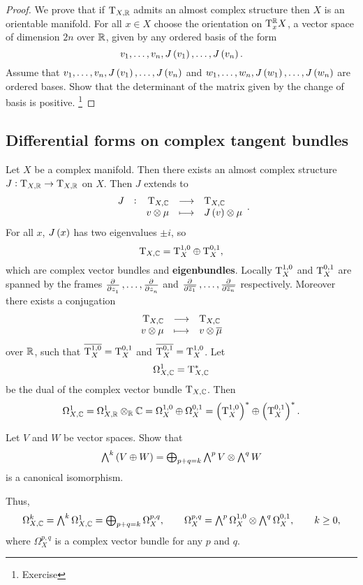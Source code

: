 \begin{proof}
We prove that if $ \mathrm{T}_{X, \mathbb{R}} $ admits an almost complex structure then $ X $ is an orientable manifold. For all $ x \in X $ choose the orientation on $ \mathrm{T}_x^{\mathbb{R}} X $, a vector space of dimension $ 2n $ over $ \mathbb{R} $, given by any ordered basis of the form
$$ v_1, \dots, v_n, J\br{v_1}, \dots, J\br{v_n}. $$
Assume that $ v_1, \dots, v_n, J\br{v_1}, \dots, J\br{v_n} $ and $ w_1, \dots, w_n, J\br{w_1}, \dots, J\br{w_n} $ are ordered bases. Show that the determinant of the matrix given by the change of basis is positive. \footnote{Exercise}
\end{proof}

\pagebreak

\subsection{Differential forms on complex tangent bundles}

Let $ X $ be a complex manifold. Then there exists an almost complex structure $ J : \mathrm{T}_{X, \mathbb{R}} \to \mathrm{T}_{X, \mathbb{R}} $ on $ X $. Then $ J $ extends to
$$ \function[J]{\T_{X, \CC}}{\T_{X, \CC}}{v \otimes \mu}{J\br{v} \otimes \mu}. $$
For all $ x $, $ J\br{x} $ has two eigenvalues $ \pm i $, so
$$ \mathrm{T}_{X, \mathbb{C}} = \mathrm{T}_X^{1, 0} \oplus \mathrm{T}_X^{0, 1}, $$
which are complex vector bundles and \textbf{eigenbundles}. Locally $ \mathrm{T}_X^{1, 0} $ and $ \mathrm{T}_X^{0, 1} $ are spanned by the frames $ \tpd{}{z_1}, \dots, \tpd{}{z_n} $ and $ \tpd{}{\overline{z_1}}, \dots, \tpd{}{\overline{z_n}} $ respectively. Moreover there exists a conjugation
$$ \function{\T_{X, \CC}}{\T_{X, \CC}}{v \otimes \mu}{v \otimes \overline{\mu}} $$
over $ \mathbb{R} $, such that $ \overline{\mathrm{T}_X^{1, 0}} = \mathrm{T}_X^{0, 1} $ and $ \overline{\mathrm{T}_X^{0, 1}} = \mathrm{T}_X^{1, 0} $. Let
$$ \Omega_{X, \mathbb{C}}^1 = \mathrm{T}_{X, \mathbb{C}}^* $$
be the dual of the complex vector bundle $ \mathrm{T}_{X, \mathbb{C}} $. Then
$$ \Omega_{X, \CC}^1 = \Omega_{X, \RR}^1 \otimes_\RR \CC = \Omega_X^{1, 0} \oplus \Omega_X^{0, 1} = \br{\T_X^{1, 0}}^* \oplus \br{\T_X^{0, 1}}^*. $$

\begin{exercise*}
Let $ V $ and $ W $ be vector spaces. Show that
$$ \textstyle\bigwedge^k\br{V \oplus W} = \bigoplus_{p + q = k} \textstyle\bigwedge^pV \otimes \textstyle\bigwedge^qW $$
is a canonical isomorphism.
\end{exercise*}


Thus,
$$ \Omega_{X, \mathbb{C}}^k = \textstyle\bigwedge^k\Omega_{X, \mathbb{C}}^1 = \bigoplus_{p + q = k} \Omega_X^{p, q}, \qquad \Omega_X^{p, q} = \textstyle\bigwedge^p\Omega_X^{1, 0} \otimes \textstyle\bigwedge^q\Omega_X^{0, 1}, \qquad k \ge 0, $$
where $ \Omega_X^{p, q} $ is a complex vector bundle for any $ p $ and $ q $.

